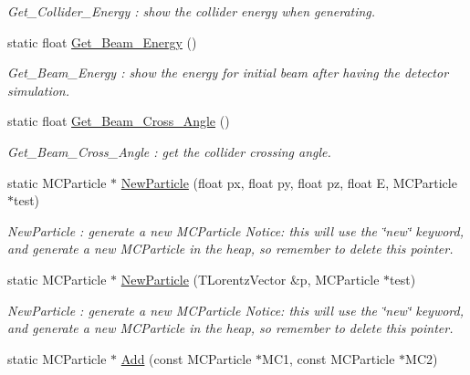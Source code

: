 \begin{DoxyCompactItemize}
\begin{DoxyCompactList}\small\item\em Get\_\-Collider\_\-Energy : show the collider energy when generating. \item\end{DoxyCompactList}\item 
static float \hyperlink{classToolSet_1_1CMC_afaf6f983eee33318bcaf7923cde7266e}{Get\_\-Beam\_\-Energy} ()
\begin{DoxyCompactList}\small\item\em Get\_\-Beam\_\-Energy : show the energy for initial beam after having the detector simulation. \item\end{DoxyCompactList}\item 
static float \hyperlink{classToolSet_1_1CMC_aab8dca236c78fffe1b63bac50583090a}{Get\_\-Beam\_\-Cross\_\-Angle} ()
\begin{DoxyCompactList}\small\item\em Get\_\-Beam\_\-Cross\_\-Angle : get the collider crossing angle. \item\end{DoxyCompactList}\item 
static MCParticle $\ast$ \hyperlink{classToolSet_1_1CMC_ab30c29f999f2b3dd1c85ed68636f2281}{NewParticle} (float px, float py, float pz, float E, MCParticle $\ast$test)
\begin{DoxyCompactList}\small\item\em NewParticle : generate a new MCParticle Notice: this will use the \char`\"{}new\char`\"{} keyword, and generate a new MCParticle in the heap, so remember to delete this pointer. \item\end{DoxyCompactList}\item 
static MCParticle $\ast$ \hyperlink{classToolSet_1_1CMC_a5bd1a7515135570ef348bd77d1d26933}{NewParticle} (TLorentzVector \&p, MCParticle $\ast$test)
\begin{DoxyCompactList}\small\item\em NewParticle : generate a new MCParticle Notice: this will use the \char`\"{}new\char`\"{} keyword, and generate a new MCParticle in the heap, so remember to delete this pointer. \item\end{DoxyCompactList}\item 
static MCParticle $\ast$ \hyperlink{classToolSet_1_1CMC_ad1b2172aaacc40d4f5971492a5d1a0f5}{Add} (const MCParticle $\ast$MC1, const MCParticle $\ast$MC2)

\end{DoxyCompactItemize}
